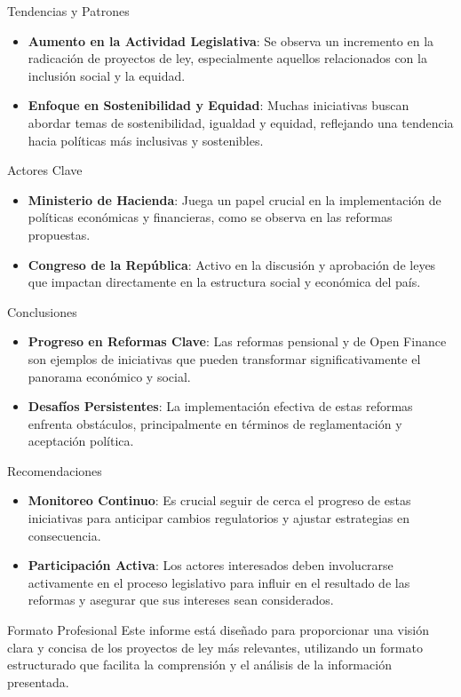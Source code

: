 \documentclass{beamer}
\begin{document}
\begin{frame}{Tendencias y Patrones}
\begin{itemize}
    \item \textbf{Aumento en la Actividad Legislativa}: Se observa un incremento en la radicación de proyectos de ley, especialmente aquellos relacionados con la inclusión social y la equidad.
    \item \textbf{Enfoque en Sostenibilidad y Equidad}: Muchas iniciativas buscan abordar temas de sostenibilidad, igualdad y equidad, reflejando una tendencia hacia políticas más inclusivas y sostenibles.
\end{itemize}
\end{frame}

\begin{frame}{Actores Clave}
\begin{itemize}
    \item \textbf{Ministerio de Hacienda}: Juega un papel crucial en la implementación de políticas económicas y financieras, como se observa en las reformas propuestas.
    \item \textbf{Congreso de la República}: Activo en la discusión y aprobación de leyes que impactan directamente en la estructura social y económica del país.
\end{itemize}
\end{frame}

\begin{frame}{Conclusiones}
\begin{itemize}
    \item \textbf{Progreso en Reformas Clave}: Las reformas pensional y de Open Finance son ejemplos de iniciativas que pueden transformar significativamente el panorama económico y social.
    \item \textbf{Desafíos Persistentes}: La implementación efectiva de estas reformas enfrenta obstáculos, principalmente en términos de reglamentación y aceptación política.
\end{itemize}
\end{frame}

\begin{frame}{Recomendaciones}
\begin{itemize}
    \item \textbf{Monitoreo Continuo}: Es crucial seguir de cerca el progreso de estas iniciativas para anticipar cambios regulatorios y ajustar estrategias en consecuencia.
    \item \textbf{Participación Activa}: Los actores interesados deben involucrarse activamente en el proceso legislativo para influir en el resultado de las reformas y asegurar que sus intereses sean considerados.
\end{itemize}
\end{frame}

\begin{frame}{Formato Profesional}
Este informe está diseñado para proporcionar una visión clara y concisa de los proyectos de ley más relevantes, utilizando un formato estructurado que facilita la comprensión y el análisis de la información presentada.
\end{frame}
\end{document}

